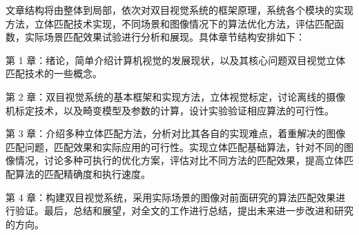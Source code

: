 文章结构将由整体到局部，依次对双目视觉系统的框架原理，系统各个模块的实现方法，立体匹配技术实现，不同场景和图像情况下的算法优化方法，评估匹配函数，实际场景匹配效果试验进行分析和展现。具体章节结构安排如下：

第 1 章：绪论，简单介绍计算机视觉的发展现状，以及其核心问题双目视觉立体匹配技术的一些概念。 

第 2 章：双目视觉系统的基本框架和实现方法，立体视觉标定，讨论离线的摄像机标定技术，以及畸变模型及参数的计算，设计实验验证相应算法的可行性。 

第 3 章：介绍多种立体匹配方法，分析对比其各自的实现难点，着重解决的图像匹配问题，匹配效果和实际应用的可行性。实现立体匹配基础算法，针对不同的图像情况，讨论多种可执行的优化方案，评估对比不同方法的匹配效果，提高立体匹配算法的匹配精确度和执行速度。

第 4 章：构建双目视觉系统，采用实际场景的图像对前面研究的算法匹配效果进行验证。最后，总结和展望，对全文的工作进行总结，提出未来进一步改进和研究的方向。 



